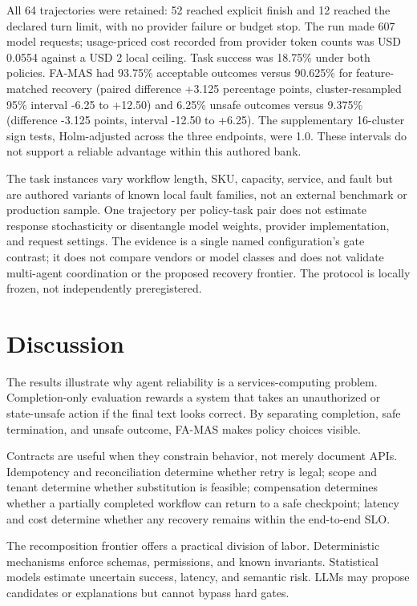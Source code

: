 \documentclass[10pt,journal,compsoc]{IEEEtran}
\newcommand{\famas}{FA-MAS}
\begin{document}
All 64 trajectories were retained: 52 reached explicit finish and 12 reached the declared turn limit, with no provider failure or budget stop. The run made 607 model requests; usage-priced cost recorded from provider token counts was USD 0.0554 against a USD 2 local ceiling. Task success was 18.75\% under both policies. \famas{} had 93.75\% acceptable outcomes versus 90.625\% for feature-matched recovery (paired difference +3.125 percentage points, cluster-resampled 95\% interval -6.25 to +12.50) and 6.25\% unsafe outcomes versus 9.375\% (difference -3.125 points, interval -12.50 to +6.25). The supplementary 16-cluster sign tests, Holm-adjusted across the three endpoints, were 1.0. These intervals do not support a reliable advantage within this authored bank.

The task instances vary workflow length, SKU, capacity, service, and fault but are authored variants of known local fault families, not an external benchmark or production sample. One trajectory per policy-task pair does not estimate response stochasticity or disentangle model weights, provider implementation, and request settings. The evidence is a single named configuration's gate contrast; it does not compare vendors or model classes and does not validate multi-agent coordination or the proposed recovery frontier. The protocol is locally frozen, not independently preregistered.

\section{Discussion}\label{sec:discussion}
The results illustrate why agent reliability is a services-computing problem. Completion-only evaluation rewards a system that takes an unauthorized or state-unsafe action if the final text looks correct. By separating completion, safe termination, and unsafe outcome, \famas{} makes policy choices visible.

Contracts are useful when they constrain behavior, not merely document APIs. Idempotency and reconciliation determine whether retry is legal; scope and tenant determine whether substitution is feasible; compensation determines whether a partially completed workflow can return to a safe checkpoint; latency and cost determine whether any recovery remains within the end-to-end SLO.

The recomposition frontier offers a practical division of labor. Deterministic mechanisms enforce schemas, permissions, and known invariants. Statistical models estimate uncertain success, latency, and semantic risk. LLMs may propose candidates or explanations but cannot bypass hard gates.
\end{document}
